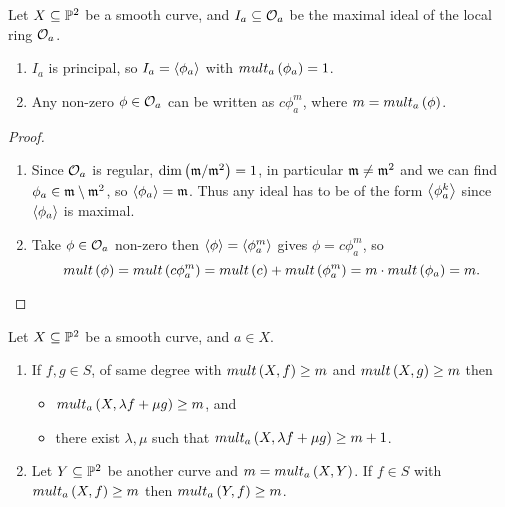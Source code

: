 \begin{lemma}
Let $ X \subseteq \P^2 $ be a smooth curve, and $ I_a \subseteq \OO_a $ be the maximal ideal of the local ring $ \OO_a $.
\begin{enumerate}
\item $ I_a $ is principal, so $ I_a = \ab{\phi_a} $ with $ mult_a\rb{\phi_a} = 1 $.
\item Any non-zero $ \phi \in \OO_a $ can be written as $ c\phi_a^m $, where $ m = mult_a\rb{\phi} $.
\end{enumerate}
\end{lemma}

\begin{proof}
\hfill
\begin{enumerate}
\item Since $ \OO_a $ is regular, $ \dim\rb{\mm / \mm^2} = 1 $, in particular $ \mm \ne \mm^2 $ and we can find $ \phi_a \in \mm \setminus \mm^2 $, so $ \ab{\phi_a} = \mm $. Thus any ideal has to be of the form $ \ab{\phi_a^k} $ since $ \ab{\phi_a} $ is maximal.
\item Take $ \phi \in \OO_a $ non-zero then $ \ab{\phi} = \ab{\phi_a^m} $ gives $ \phi = c\phi_a^m $, so
$$ mult\rb{\phi} = mult\rb{c\phi_a^m} = mult\rb{c} + mult\rb{\phi_a^m} = m \cdot mult\rb{\phi_a} = m. $$
\end{enumerate}
\end{proof}

\begin{lemma}
Let $ X \subseteq \P^2 $ be a smooth curve, and $ a \in X $.
\begin{enumerate}
\item If $ f, g \in S $, of same degree with $ mult\rb{X, f} \ge m $ and $ mult\rb{X, g} \ge m $ then
\begin{itemize}
\item $ mult_a\rb{X, \lambda f + \mu g} \ge m $, and
\item there exist $ \lambda, \mu $ such that $ mult_a\rb{X, \lambda f + \mu g} \ge m + 1 $.
\end{itemize}
\item Let $ Y \subseteq \P^2 $ be another curve and $ m = mult_a\rb{X, Y} $. If $ f \in S $ with $ mult_a\rb{X, f} \ge m $ then $ mult_a\rb{Y, f} \ge m $.
\end{enumerate}
\end{lemma}

